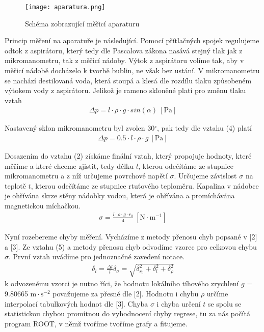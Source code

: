 \documentclass[a4paper]{article}
\begin{document}
\begin{figure}[H]
\centering
\texttt{[image: aparatura.png]}
\caption{Schéma zobrazující měřicí aparaturu}
\end{figure}
\par Princip měření na aparatuře je následující. Pomocí přítlačných spojek regulujeme odtok z aspirátoru, který tedy dle Pascalova zákona nasává stejný tlak jak z mikromanometru, tak z měřicí nádoby. Výtok z aspirátoru volíme tak, aby v měřicí nádobě docházelo k tvorbě bublin, ne však bez ustání. V mikromanometru se nachází destilovaná voda, která stoupá a klesá dle rozdílu tlaku způsobeném výtokem vody z aspirátoru. Jelikož je rameno skloněné platí pro změnu tlaku vztah
\begin{align}
\Delta p = l \cdot \rho \cdot g \cdot sin(\alpha) \: \mathrm{[Pa]}
\end{align}
\par Nastavený sklon mikromanometru byl zvolen 30$^\circ$, pak tedy dle vztahu (4) platí
\begin{align}
\Delta p = 0.5 \cdot l \cdot \rho \cdot g \: \mathrm{[Pa]}
\end{align}
\par Dosazením do vztahu (2) získáme finální vztah, který propojuje hodnoty, které měříme a které chceme zjistit, tedy délku $l$, kterou odečítáme ze stupnice mikromanometru a z níž určujeme povrchové napětí $\sigma$. Určujeme závislost $\sigma$ na teplotě $t$, kterou odečítáme ze stupnice rtuťového teploměru. Kapalina v nádobce je ohřívána skrze stěny nádobky vodou, která je ohřívána a promíchávána magnetickou míchačkou.
\begin{align}
\sigma = \frac{l \cdot \rho \cdot g \cdot r_{0}}{4} \: \mathrm{[N \cdot m^{-1}]}
\end{align}
\par Nyní rozebereme chyby měření. Vycházíme z metody přenosu chyb popsané v [2] a [3].
Ze vztahu (5) a metody přenosu chyb odvodíme vzorec pro celkovou chybu $\sigma$. První vztah uvádíme pro jednoznačné zavedení notace.
\begin{align}
\delta_{l} = \frac{\Delta l}{l}
\delta_{\sigma} = \sqrt{\delta_{r_{0}}^{2} + \delta_{l}^{2} + \delta_{\rho}^{2} }
\end{align}
k odvozenému vzorci je nutno říci, že hodnotu lokálního tíhového zrychlení $g$ = 9.80665 $\mathrm{m \cdot s^{-2}}$ považujeme za přesné dle [2]. Hodnotu i chybu $\rho$ určíme interpolací tabulkových hodnot dle [3]. Chyba $\sigma$ i chyba určení $t$ se spolu se statistickou chybou promítnou do vyhodnocení chyby regrese, tu za nás počítá program ROOT, v němž tvoříme tvoříme grafy a fitujeme.
\end{document}
